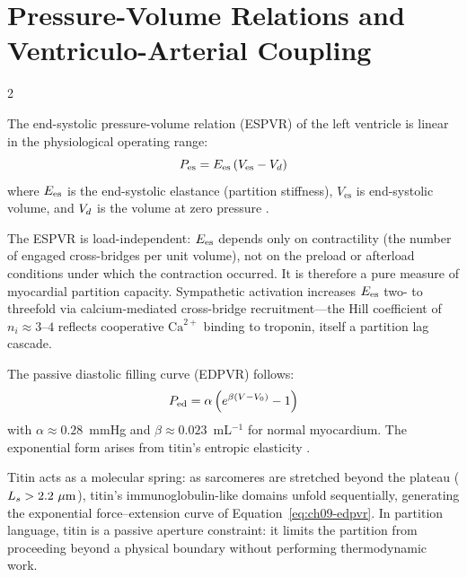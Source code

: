\section{Pressure-Volume Relations and Ventriculo-Arterial Coupling}
\label{sec:ch09-pvrelations}

\begin{multicols}{2}

\begin{theorem}
\label{thm:ch09-espvr}
The end-systolic pressure-volume relation (ESPVR) of the left
ventricle is linear in the physiological operating range:
\begin{equation}
P_{\mathrm{es}} = E_{\mathrm{es}}\,(V_{\mathrm{es}} - V_d)
\label{eq:ch09-espvr}
\end{equation}
where $E_{\mathrm{es}}$ is the end-systolic elastance (partition stiffness),
$V_{\mathrm{es}}$ is end-systolic volume, and $V_d$ is the volume
at zero pressure \citep{suga1974instantaneous}.
\end{theorem}

The ESPVR is load-independent: $E_{\mathrm{es}}$ depends only on contractility
(the number of engaged cross-bridges per unit volume), not on the
preload or afterload conditions under which the contraction occurred.
It is therefore a pure measure of myocardial partition capacity.
Sympathetic activation increases $E_{\mathrm{es}}$ two- to threefold
\citep{sagawa1988cardiac} via calcium-mediated cross-bridge
recruitment---the Hill coefficient of $n_i \approx 3$--$4$
reflects cooperative $\mathrm{Ca}^{2+}$ binding to troponin,
itself a partition lag cascade.

\begin{theorem}
\label{thm:ch09-edpvr}
The passive diastolic filling curve (EDPVR) follows:
\begin{equation}
P_{\mathrm{ed}} = \alpha\left(e^{\beta(V - V_0)} - 1\right)
\label{eq:ch09-edpvr}
\end{equation}
with $\alpha \approx 0.28$~mmHg and $\beta \approx 0.023$~mL$^{-1}$
for normal myocardium. The exponential form arises from titin's
entropic elasticity \citep{granzier1995titin}.
\end{theorem}

\columnbreak

Titin acts as a molecular spring: as sarcomeres are stretched beyond
the plateau ($L_s > 2.2~\mu\mathrm{m}$), titin's immunoglobulin-like
domains unfold sequentially, generating the exponential force--extension
curve of Equation~\eqref{eq:ch09-edpvr}. In partition language, titin
is a passive aperture constraint: it limits the partition from
proceeding beyond a physical boundary without performing thermodynamic
work.


\end{multicols}
